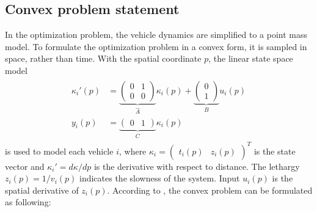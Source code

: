 \documentclass[letterpaper,10pt,conference]{ieeeconf}
\begin{document}
\subsection{Convex problem statement}
In the optimization problem, the vehicle dynamics are simplified to a point mass model. To formulate the optimization problem in a convex form, it is sampled in space, rather than time.
With the spatial coordinate $p$, the linear state space model
\begin{align}\label{statesp}
\begin{split}
\kappa_i'(p)&=\underbrace{\begin{pmatrix}
0& 1\\
0& 0
\end{pmatrix}}_{\hat{A}}\kappa_i(p) + \underbrace{\begin{pmatrix}
0\\
1\end{pmatrix}}_Bu_i(p)\\
y_i(p) &= \underbrace{\begin{pmatrix}
0 & 1
\end{pmatrix}}_C\kappa_i(p)
\end{split}
\end{align}
is used to model each vehicle $i$, where $\kappa_i=\begin{pmatrix}t_i(p)& z_i(p)\end{pmatrix}^T$ is the state vector and $\kappa_i'=d\kappa/dp$ is the derivative with respect to distance. The lethargy $z_i(p)=1/v_i(p)$ indicates the slowness of the system. Input $u_i(p)$ is the spatial derivative of $z_i(p)$. 
According to \cite{nikolce}, the convex problem can be formulated as following:
\end{document}
